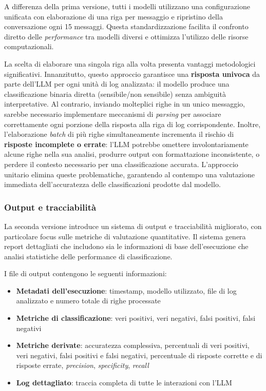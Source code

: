 \documentclass[12pt,twoside]{report}
\begin{document}
A differenza della prima versione, tutti i modelli utilizzano una configurazione unificata con elaborazione di una riga per messaggio e ripristino della conversazione ogni 15 messaggi. Questa standardizzazione facilita il confronto diretto delle \textit{performance} tra modelli diversi e ottimizza l'utilizzo delle risorse computazionali.

La scelta di elaborare una singola riga alla volta presenta vantaggi metodologici significativi. Innanzitutto, questo approccio garantisce una \textbf{risposta univoca} da parte dell'LLM per ogni unità di log analizzata: il modello produce una classificazione binaria diretta (sensibile/non sensibile) senza ambiguità interpretative. Al contrario, inviando molteplici righe in un unico messaggio, sarebbe necessario implementare meccanismi di \textit{parsing} per associare correttamente ogni porzione della risposta alla riga di log corrispondente. Inoltre, l'elaborazione \textit{batch} di più righe simultaneamente incrementa il rischio di \textbf{risposte incomplete o errate}: l'LLM potrebbe omettere involontariamente alcune righe nella sua analisi, produrre output con formattazione inconsistente, o perdere il contesto necessario per una classificazione accurata. L'approccio unitario elimina queste problematiche, garantendo al contempo una valutazione immediata dell'accuratezza delle classificazioni prodotte dal modello.

\subsubsection{Output e tracciabilità}
\label{subsubsec:ver2_output}

La seconda versione introduce un sistema di output e tracciabilità migliorato, con particolare focus sulle metriche di valutazione quantitative. Il sistema genera report dettagliati che includono sia le informazioni di base dell'esecuzione che analisi statistiche delle performance di classificazione.

I file di output contengono le seguenti informazioni:

\begin{itemize}
    \item \textbf{Metadati dell'esecuzione}: timestamp, modello utilizzato, file di log analizzato e numero totale di righe processate
    \item \textbf{Metriche di classificazione}: veri positivi, veri negativi, falsi positivi, falsi negativi
    \item \textbf{Metriche derivate}: accuratezza complessiva, percentuali di veri positivi, veri negativi, falsi positivi e falsi negativi, percentuale di risposte corrette e di risposte errate, \textit{precision}, \textit{specificity}, \textit{recall}
    \item \textbf{Log dettagliato}: traccia completa di tutte le interazioni con l'LLM
\end{itemize}
\end{document}
